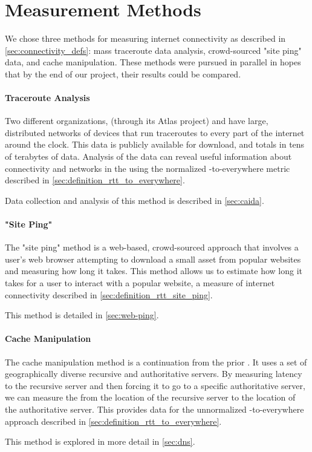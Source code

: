 \section{Measurement Methods}\label{sec:methods_overview}

We chose three methods for measuring internet connectivity as described in \cref{sec:connectivity_defs}: mass traceroute data analysis, crowd-sourced "site ping" data, and \dns cache manipulation. These methods were pursued in parallel in hopes that by the end of our project, their results could be compared.


\paragraph{Traceroute Analysis} Two different organizations, \ripe (through its Atlas project) and \caida have large, distributed networks of devices that run traceroutes to every part of the internet around the clock. This data is publicly available for download, and totals in tens of terabytes of data. Analysis of the data can reveal useful information about connectivity and networks in the \us using the normalized \rtt-to-everywhere metric described in \cref{sec:definition_rtt_to_everywhere}.

Data collection and analysis of this method is described in \cref{sec:caida}.

\paragraph{"Site Ping"} The "site ping" method is a web-based, crowd-sourced approach that involves a user's web browser attempting to download a small asset from popular websites and measuring how long it takes. This method allows us to estimate how long it takes for a user to interact with a popular website, a measure of internet connectivity described in \cref{sec:definition_rtt_site_ping}.

This method is detailed in \cref{sec:web-ping}.

\paragraph{\DNS Cache Manipulation} The \dns cache manipulation method is a continuation from the prior \mqp \cite{Fakult2019}. It uses a set of geographically diverse recursive and authoritative \dns servers. By measuring latency to the recursive \dns server and then forcing it to go to a specific authoritative server, we can measure the \rtt from the location of the recursive server to the location of the authoritative server. This provides data for the unnormalized \rtt-to-everywhere approach described in \cref{sec:definition_rtt_to_everywhere}.

This method is explored in more detail in \cref{sec:dns}.